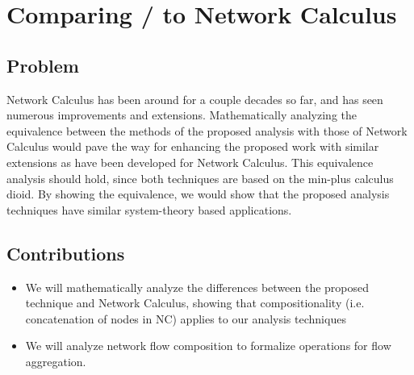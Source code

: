 \newpage

\section{Comparing \shorttool/ to Network Calculus}
\label{sec:equivalence}

\subsection{Problem}
Network Calculus has been around for a couple decades so far, and has
seen numerous improvements and extensions.  Mathematically analyzing
the equivalence between the methods of the proposed analysis with
those of Network Calculus would pave the way for enhancing the
proposed work with similar extensions as have been developed for
Network Calculus.  This equivalence analysis should hold, since both
techniques are based on the min-plus calculus dioid.  By showing the
equivalence, we would show that the proposed analysis techniques have
similar system-theory based applications.

\subsection{Contributions}
\begin{itemize}
	\item We will mathematically analyze the differences between
          the proposed technique and Network Calculus, showing that
          compositionality (i.e. concatenation of nodes in NC) applies
          to our analysis techniques
	\item We will analyze network flow composition to formalize
          operations for flow aggregation.
\end{itemize}

